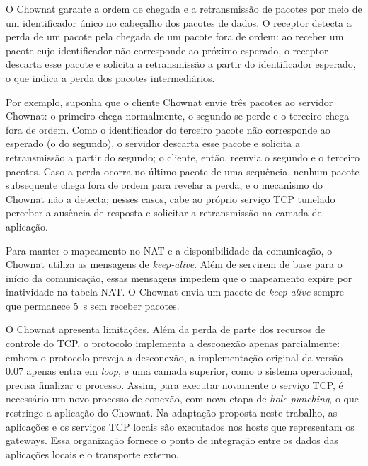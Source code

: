 O Chownat garante a ordem de chegada e a retransmissão de pacotes por meio de um identificador único no cabeçalho dos pacotes de dados. O receptor detecta a perda de um pacote pela chegada de um pacote fora de ordem: ao receber um pacote cujo identificador não corresponde ao próximo esperado, o receptor descarta esse pacote e solicita a retransmissão a partir do identificador esperado, o que indica a perda dos pacotes intermediários.

Por exemplo, suponha que o cliente Chownat envie três pacotes ao servidor Chownat: o primeiro chega normalmente, o segundo se perde e o terceiro chega fora de ordem. Como o identificador do terceiro pacote não corresponde ao esperado (o do segundo), o servidor descarta esse pacote e solicita a retransmissão a partir do segundo; o cliente, então, reenvia o segundo e o terceiro pacotes. Caso a perda ocorra no último pacote de uma sequência, nenhum pacote subsequente chega fora de ordem para revelar a perda, e o mecanismo do Chownat não a detecta; nesses casos, cabe ao próprio serviço TCP tunelado perceber a ausência de resposta e solicitar a retransmissão na camada de aplicação.

Para manter o mapeamento no NAT e a disponibilidade da comunicação, o Chownat utiliza as mensagens de \textit{keep-alive}. Além de servirem de base para o início da comunicação, essas mensagens impedem que o mapeamento expire por inatividade na tabela NAT. O Chownat envia um pacote de \textit{keep-alive} sempre que permanece 5~s sem receber pacotes.

O Chownat apresenta limitações. Além da perda de parte dos recursos de controle do TCP, o protocolo implementa a desconexão apenas parcialmente: embora o protocolo preveja a desconexão, a implementação original da versão 0.07 apenas entra em \textit{loop}, e uma camada superior, como o sistema operacional, precisa finalizar o processo. Assim, para executar novamente o serviço TCP, é necessário um novo processo de conexão, com nova etapa de \textit{hole punching}, o que restringe a aplicação do Chownat. Na adaptação proposta neste trabalho, as aplicações e os serviços TCP locais são executados nos hosts que representam os gateways. Essa organização fornece o ponto de integração entre os dados das aplicações locais e o transporte externo.

